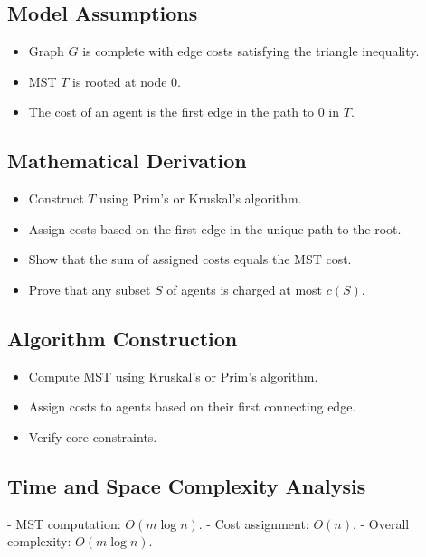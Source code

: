\documentclass{article}
\begin{document}
\subsection*{Model Assumptions}
\begin{itemize}
    \item Graph $G$ is complete with edge costs satisfying the triangle inequality.
    \item MST $T$ is rooted at node 0.
    \item The cost of an agent is the first edge in the path to 0 in $T$.
\end{itemize}

\subsection*{Mathematical Derivation}
\begin{itemize}
    \item Construct $T$ using Prim’s or Kruskal’s algorithm.
    \item Assign costs based on the first edge in the unique path to the root.
    \item Show that the sum of assigned costs equals the MST cost.
    \item Prove that any subset $S$ of agents is charged at most $c(S)$.
\end{itemize}

\subsection*{Algorithm Construction}
\begin{itemize}
    \item Compute MST using Kruskal’s or Prim’s algorithm.
    \item Assign costs to agents based on their first connecting edge.
    \item Verify core constraints.
\end{itemize}

\subsection*{Time and Space Complexity Analysis}
- MST computation: $O(m \log n)$.
- Cost assignment: $O(n)$.
- Overall complexity: $O(m \log n)$. 
\end{document}
